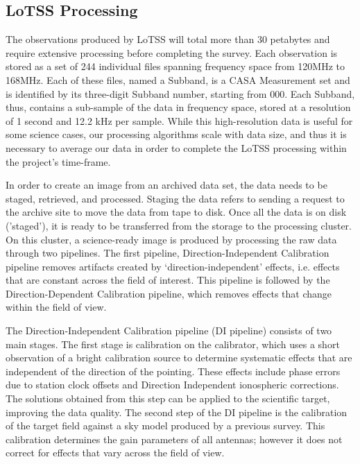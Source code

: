 \subsection{LoTSS Processing}

The observations produced by LoTSS will total more than 30 petabytes and require extensive processing before completing the survey. Each observation is stored as a set of 244 individual files spanning frequency space from 120MHz to 168MHz. Each of these files, named a \Gls{Subband}, is a CASA Measurement set\citep{casacore_ms} and is identified by its three-digit Subband number, starting from 000. Each Subband, thus, contains a sub-sample of the data in frequency space, stored at a resolution of 1 second and 12.2 kHz per sample. While this high-resolution data is useful for some science cases, our processing algorithms scale with data size, and thus it is necessary to average our data in order to complete the LoTSS processing within the project's time-frame. 

In order to create an image from an archived data set, the data needs to be staged, retrieved, and processed. Staging the data refers to sending a request to the archive site to move the data from tape to disk. Once all the data is on disk ('staged'), it is ready to be transferred from the storage to the processing cluster. On this cluster, a science-ready image is produced by processing the raw data through two pipelines. The first pipeline, Direction-Independent Calibration pipeline removes artifacts created by `direction-independent' effects, i.e. effects that are constant across the field of interest. This pipeline is followed by the Direction-Dependent Calibration pipeline, which removes effects that change within the field of view.
 
The Direction-Independent Calibration pipeline (DI pipeline) consists of two main stages. The first stage is calibration on the calibrator, which uses a short observation of a bright calibration source to determine systematic effects that are independent of the direction of the pointing. These effects include phase errors due to station clock offsets and Direction Independent ionospheric corrections. The solutions obtained from this step can be applied to the scientific target, improving the data quality. The second step of the DI pipeline is the calibration of the target field against a sky model produced by a previous survey. This calibration determines the gain parameters of all antennas; however it does not correct for effects that vary across the field of view. 
 
